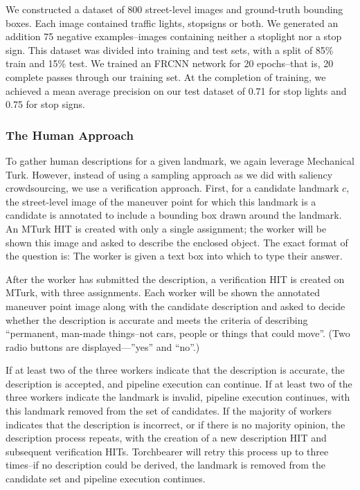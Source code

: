 We constructed a dataset of 800 street-level images and ground-truth bounding boxes. Each image contained traffic lights, stopsigns or both. We generated an addition 75 negative examples--images containing neither a stoplight nor a stop sign. This dataset was divided into training and test sets, with a split of 85\% train and 15\% test. We trained an FRCNN network for 20 epochs--that is, 20 complete passes through our training set. At the completion of training, we achieved a mean average precision on our test dataset of 0.71 for stop lights and 0.75 for stop signs.
	
\subsubsection{The Human Approach}
To gather human descriptions for a given landmark, we again leverage Mechanical Turk. However, instead of using a sampling approach as we did with saliency crowdsourcing, we use a verification approach.
First, for a candidate landmark $c$, the street-level image of the maneuver point for which this landmark is a candidate is annotated to include a bounding box drawn around the landmark. An MTurk HIT is created with only a single assignment; the worker will be shown this image and asked to describe the enclosed object. The exact format of the question is:  The worker is given a text box into which to type their answer.

After the worker has submitted the description, a verification HIT is created on MTurk, with three assignments. Each worker will be shown the annotated maneuver point image along with the candidate description and asked to decide whether the description is accurate and meets the criteria of describing “permanent, man-made things--not cars, people or things that could move”. (Two radio buttons are displayed—”yes” and “no”.)

 If at least two of the three workers indicate that the description is accurate, the description is accepted, and pipeline execution can continue. If at least two of the three workers indicate the landmark is invalid, pipeline execution continues, with this landmark removed from the set of candidates. If the majority of workers indicates that the description is incorrect, or if there is no majority opinion, the description process repeats, with the creation of a new description HIT and subsequent verification HITs. Torchbearer will retry this process up to three times--if no description could be derived, the landmark is removed from the candidate set and pipeline execution continues.

